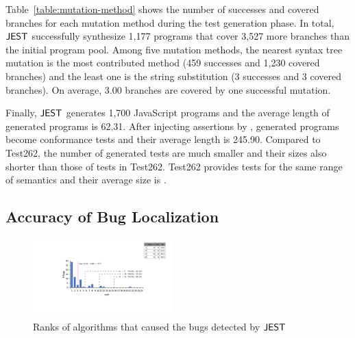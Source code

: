Table~\ref{table:mutation-method} shows the number of successes and covered
branches for each mutation method during the test generation phase.  In total,
$\tool$ successfully synthesize 1,177 programs that cover 3,527
more branches than the initial program pool.  Among five mutation methods, the
nearest syntax tree mutation is the most contributed method (459
successes and 1,230 covered branches) and the least one is the string
substitution (3 successes and 3 covered branches).  On average,
3.00 branches are covered by one successful mutation.

Finally, $\tool$ generates 1,700 JavaScript programs and the average
length of generated programs is 62.31.  After injecting assertions by
, generated programs become conformance tests and
their average length is 245.90.  Compared to Test262, the number of
generated tests are much smaller and their sizes also shorter than those of tests
in Test262.  Test262 provides  tests for the same range of
semantics and their average size is .


\subsection{Accuracy of Bug Localization}

\begin{figure}[t]
  \centering
  \includegraphics[width=0.48\textwidth]{img/localize.pdf}
  \caption{Ranks of algorithms that caused the bugs detected by $\tool$}
  \label{fig:localize}
  \vspace*{-1em}
\end{figure}

